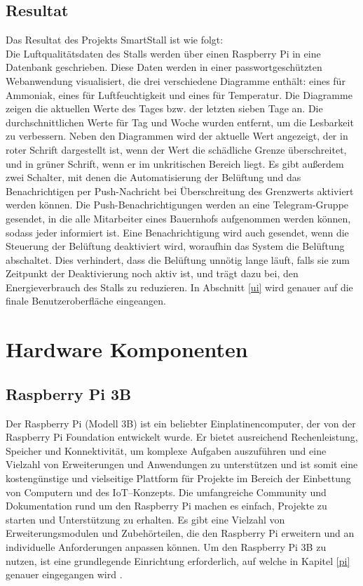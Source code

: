 \documentclass[conference]{IEEEtran}
\begin{document}
\subsection{Resultat}
Das Resultat des Projekts SmartStall ist wie folgt: \\
Die Luftqualitätsdaten des Stalls werden über einen Raspberry Pi in eine Datenbank geschrieben. Diese Daten werden in einer passwortgeschützten Webanwendung visualisiert, die drei verschiedene Diagramme enthält: eines für Ammoniak, eines für Luftfeuchtigkeit und eines für Temperatur. Die Diagramme zeigen die aktuellen Werte des Tages bzw. der letzten sieben Tage an. Die durchschnittlichen Werte für Tag und Woche wurden entfernt, um die Lesbarkeit zu verbessern.
Neben den Diagrammen wird der aktuelle Wert angezeigt, der in roter Schrift dargestellt ist, wenn der Wert die schädliche Grenze überschreitet, und in grüner Schrift, wenn er im unkritischen Bereich liegt. Es gibt außerdem zwei Schalter, mit denen die Automatisierung der Belüftung und das Benachrichtigen per Push-Nachricht bei Überschreitung des Grenzwerts aktiviert werden können.
Die Push-Benachrichtigungen werden an eine Telegram-Gruppe gesendet, in die alle Mitarbeiter eines Bauernhofs aufgenommen werden können, sodass jeder informiert ist. Eine Benachrichtigung wird auch gesendet, wenn die Steuerung der Belüftung deaktiviert wird, woraufhin das System die Belüftung abschaltet. Dies verhindert, dass die Belüftung unnötig lange läuft, falls sie zum Zeitpunkt der Deaktivierung noch aktiv ist, und trägt dazu bei, den Energieverbrauch des Stalls zu reduzieren. In Abschnitt \ref{ui} wird genauer auf die finale Benutzeroberfläche eingeangen.

\section{Hardware Komponenten}
\subsection{Raspberry Pi 3B}
Der Raspberry Pi (Modell 3B) ist ein beliebter Einplatinencomputer, der von der Raspberry Pi Foundation entwickelt wurde. Er bietet ausreichend Rechenleistung, Speicher und Konnektivität, um komplexe Aufgaben auszuführen und eine Vielzahl von Erweiterungen und Anwendungen zu unterstützen und ist somit eine kostengünstige und vielseitige Plattform für Projekte im Bereich der Einbettung von Computern und des IoT--Konzepts. Die umfangreiche Community und Dokumentation rund um den Raspberry Pi machen es einfach, Projekte zu starten und Unterstützung zu erhalten. Es gibt eine Vielzahl von Erweiterungsmodulen und Zubehörteilen, die den Raspberry Pi erweitern und an individuelle Anforderungen anpassen können. Um den Raspberry Pi 3B zu nutzen, ist eine grundlegende Einrichtung erforderlich, auf welche in Kapitel \ref{pi} genauer eingegangen wird  \cite{raspy}.
\end{document}
